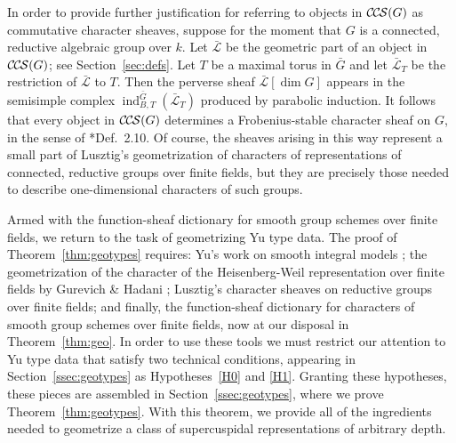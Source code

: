 \documentclass[10pt]{amsart}
\theoremstyle{plain}
\theoremstyle{definition}
\newcommand{\Fq}{k}
\newcommand{\gcs}[1]{{\mathcal{\bar #1}}}
\newcommand{\CCS}{{\mathcal{C\hskip-.8pt C\hskip-0.8pt S}}}
\newcommand{\bG}{\bar{G}}
\begin{document}
In order to provide further justification for referring to objects in $\CCS(G)$ as commutative character sheaves, suppose for the moment that $G$ is a connected, reductive algebraic group over $\Fq$.
Let $\gcs{L}$ be the geometric part of an object in $\CCS(G)$; see Section~\ref{sec:defs}.
Let $T$ be a maximal torus in $\bG$ and let $\gcs{L}_T$ be the restriction of $\gcs{L}$ to $T$.
Then the perverse sheaf $\gcs{L}[\dim G]$ appears in the semisimple complex $\operatorname{ind}_{B,T}^{\bG}(\gcs{L}_T)$ produced by parabolic induction.
It follows that every object in $\CCS(G)$ determines a Frobenius-stable character sheaf on $G$, in the sense of \cite{lusztig:85a}*{Def.~2.10}. 
Of course, the sheaves arising in this way represent a small part of Lusztig's geometrization of characters of representations of connected, reductive groups over finite fields, but they are precisely those needed to describe one-dimensional characters of such groups. 

Armed with the function-sheaf dictionary for smooth group schemes over finite fields, we return to the task of geometrizing Yu type data. 
The proof of Theorem~\ref{thm:geotypes} requires: Yu's work on smooth integral models \cite{Yu:models}; the geometrization of the character of the Heisenberg-Weil representation over finite fields by Gurevich \& Hadani \cite{gurevich-hadani:07a}; Lusztig's character sheaves on reductive groups over finite fields; and finally, the function-sheaf dictionary for characters of smooth group schemes over finite fields, now at our disposal in Theorem~\ref{thm:geo}.
In order to use these tools we must restrict our attention to Yu type data that satisfy two technical conditions, appearing in Section~\ref{ssec:geotypes} as Hypotheses~\ref{H0} and \ref{H1}. 
Granting these hypotheses, these pieces are assembled in Section~\ref{ssec:geotypes}, where we prove Theorem~\ref{thm:geotypes}.
With this theorem, we provide all of the ingredients needed to geometrize a class of supercuspidal representations of arbitrary depth. 
 
\bigskip
\end{document}
